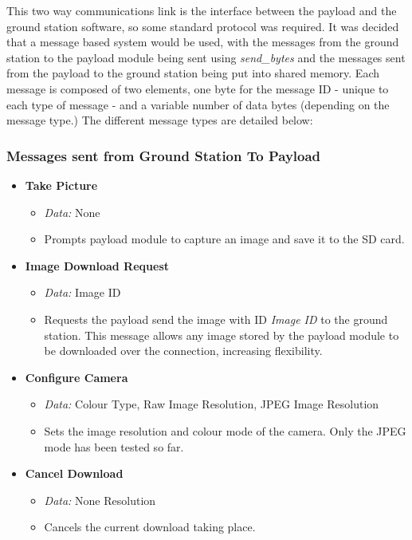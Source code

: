This two way communications link is the interface between the payload and the 
ground station software, so some standard protocol was required. It was decided
that a message based system would be used, with the messages from the ground
station to the payload module being sent using \emph{send\_bytes} and the 
messages sent from the payload to the ground station being put into shared
memory. Each message is composed of two elements, one byte for the message ID 
- unique to each type of message - and a variable number of data bytes 
(depending on the message type.) The different message types are detailed 
below:

\subsubsection*{Messages sent from Ground Station To Payload}

\begin{itemize}
\item \textbf{Take Picture}
\begin{itemize}
\item \emph{Data:} None
\item Prompts payload module to capture an image and save it to the SD card.
\end{itemize}

\item \textbf{Image Download Request} 
\begin{itemize}

\item \emph{Data:} Image ID
\item Requests the payload send the image with ID \emph{Image ID} to the 
ground station. This message allows any image stored by the payload module 
to be downloaded over the connection, increasing flexibility. 
\end{itemize}

\item \textbf{Configure Camera}
\begin{itemize}
\item \emph{Data:} Colour Type, Raw Image Resolution, JPEG Image
Resolution
\item Sets the image resolution and colour mode of the camera. Only the 
JPEG mode has been tested so far.
\end{itemize}

\item \textbf{Cancel Download}
\begin{itemize}
\item \emph{Data:} None
Resolution
\item Cancels the current download taking place.
\end{itemize}

\end{itemize}

